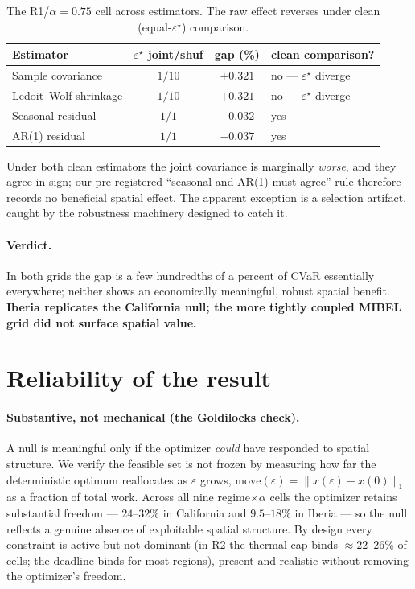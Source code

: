 \documentclass[11pt]{article}
\begin{document}
\begin{table}[h]\centering
\caption{The R1/$\alpha{=}0.75$ cell across estimators. The raw effect reverses under clean (equal-$\varepsilon^\star$) comparison.}
\label{tab:artifact}
\begin{tabular}{@{}lccl@{}}
\toprule
Estimator & $\varepsilon^\star$ joint/shuf & gap (\%) & clean comparison? \\
\midrule
Sample covariance      & $1/10$ & $+0.321$ & no --- $\varepsilon^\star$ diverge \\
Ledoit--Wolf shrinkage & $1/10$ & $+0.321$ & no --- $\varepsilon^\star$ diverge \\
Seasonal residual      & $1/1$  & $-0.032$ & yes \\
AR(1) residual         & $1/1$  & $-0.037$ & yes \\
\bottomrule
\end{tabular}
\end{table}

Under both clean estimators the joint covariance is marginally \emph{worse}, and they agree in sign; our
pre-registered ``seasonal and AR(1) must agree'' rule therefore records no beneficial spatial effect. The
apparent exception is a selection artifact, caught by the robustness machinery designed to catch it.

\paragraph{Verdict.} In both grids the gap is a few hundredths of a percent of CVaR essentially
everywhere; neither shows an economically meaningful, robust spatial benefit. \textbf{Iberia replicates
the California null; the more tightly coupled MIBEL grid did not surface spatial value.}

\section{Reliability of the result}\label{sec:reliable}

\paragraph{Substantive, not mechanical (the Goldilocks check).} A null is meaningful only if the
optimizer \emph{could} have responded to spatial structure. We verify the feasible set is not frozen by
measuring how far the deterministic optimum reallocates as $\varepsilon$ grows,
$\mathrm{move}(\varepsilon)=\lVert x(\varepsilon)-x(0)\rVert_1$ as a fraction of total work. Across all
nine regime$\times\alpha$ cells the optimizer retains substantial freedom --- $24$--$32\%$ in California
and $9.5$--$18\%$ in Iberia --- so the null reflects a genuine absence of exploitable spatial structure.
By design every constraint is active but not dominant (in R2 the thermal cap binds $\approx 22$--$26\%$
of cells; the deadline binds for most regions), present and realistic without removing the optimizer's
freedom.
\end{document}
